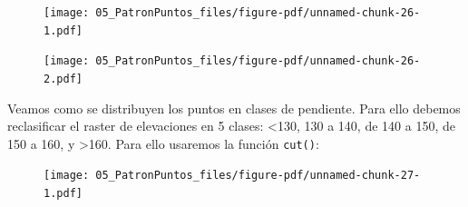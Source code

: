 \documentclass[
  letterpaper,
  DIV=11,
  numbers=noendperiod]{scrreprt}
\newenvironment{Shaded}{\begin{snugshade}}{\end{snugshade}}
\newcommand{\AttributeTok}[1]{\textcolor[rgb]{0.40,0.45,0.13}{#1}}
\newcommand{\CommentTok}[1]{\textcolor[rgb]{0.37,0.37,0.37}{#1}}
\newcommand{\ConstantTok}[1]{\textcolor[rgb]{0.56,0.35,0.01}{#1}}
\newcommand{\DecValTok}[1]{\textcolor[rgb]{0.68,0.00,0.00}{#1}}
\newcommand{\FunctionTok}[1]{\textcolor[rgb]{0.28,0.35,0.67}{#1}}
\newcommand{\NormalTok}[1]{\textcolor[rgb]{0.00,0.23,0.31}{#1}}
\newcommand{\OtherTok}[1]{\textcolor[rgb]{0.00,0.23,0.31}{#1}}
\newcommand{\SpecialCharTok}[1]{\textcolor[rgb]{0.37,0.37,0.37}{#1}}
\begin{document}
\begin{Shaded}
\end{Shaded}

\begin{figure}[H]

{\centering \texttt{[image: 05\_PatronPuntos\_files/figure-pdf/unnamed-chunk-26-1.pdf]}

}

\end{figure}

\begin{Shaded}
\end{Shaded}

\begin{figure}[H]

{\centering \texttt{[image: 05\_PatronPuntos\_files/figure-pdf/unnamed-chunk-26-2.pdf]}

}

\end{figure}

Veamos como se distribuyen los puntos en clases de pendiente. Para ello
debemos reclasificar el raster de elevaciones en 5 clases: \textless130,
130 a 140, de 140 a 150, de 150 a 160, y \textgreater160. Para ello
usaremos la función \texttt{cut()}:

\begin{Shaded}
\end{Shaded}

\begin{figure}[H]

{\centering \texttt{[image: 05\_PatronPuntos\_files/figure-pdf/unnamed-chunk-27-1.pdf]}

}

\end{figure}

\begin{Shaded}
\end{Shaded}
\end{document}
